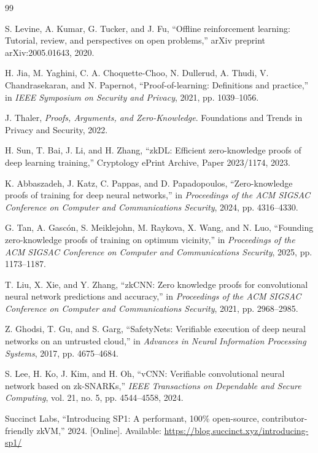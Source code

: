 \documentclass[12pt,a4paper,oneside]{report}
\begin{document}
\clearpage
\begin{thebibliography}{99}

S. Levine, A. Kumar, G. Tucker, and J. Fu,
``Offline reinforcement learning: Tutorial, review, and perspectives on open problems,''
arXiv preprint arXiv:2005.01643, 2020.

H. Jia, M. Yaghini, C. A. Choquette-Choo, N. Dullerud, A. Thudi, V. Chandrasekaran, and N. Papernot,
``Proof-of-learning: Definitions and practice,''
in \textit{IEEE Symposium on Security and Privacy}, 2021, pp. 1039--1056.

J. Thaler,
\textit{Proofs, Arguments, and Zero-Knowledge}.
Foundations and Trends in Privacy and Security, 2022.

H. Sun, T. Bai, J. Li, and H. Zhang,
``zkDL: Efficient zero-knowledge proofs of deep learning training,''
Cryptology ePrint Archive, Paper 2023/1174, 2023.

K. Abbaszadeh, J. Katz, C. Pappas, and D. Papadopoulos,
``Zero-knowledge proofs of training for deep neural networks,''
in \textit{Proceedings of the ACM SIGSAC Conference on Computer and Communications Security}, 2024, pp. 4316--4330.

G. Tan, A. Gascón, S. Meiklejohn, M. Raykova, X. Wang, and N. Luo,
``Founding zero-knowledge proofs of training on optimum vicinity,''
in \textit{Proceedings of the ACM SIGSAC Conference on Computer and Communications Security}, 2025, pp. 1173--1187.

T. Liu, X. Xie, and Y. Zhang,
``zkCNN: Zero knowledge proofs for convolutional neural network predictions and accuracy,''
in \textit{Proceedings of the ACM SIGSAC Conference on Computer and Communications Security}, 2021, pp. 2968--2985.

Z. Ghodsi, T. Gu, and S. Garg,
``SafetyNets: Verifiable execution of deep neural networks on an untrusted cloud,''
in \textit{Advances in Neural Information Processing Systems}, 2017, pp. 4675--4684.

S. Lee, H. Ko, J. Kim, and H. Oh,
``vCNN: Verifiable convolutional neural network based on zk-SNARKs,''
\textit{IEEE Transactions on Dependable and Secure Computing}, vol. 21, no. 5, pp. 4544--4558, 2024.

Succinct Labs,
``Introducing SP1: A performant, 100\% open-source, contributor-friendly zkVM,''
2024. [Online]. Available: \url{https://blog.succinct.xyz/introducing-sp1/}


\end{thebibliography}
\end{document}
